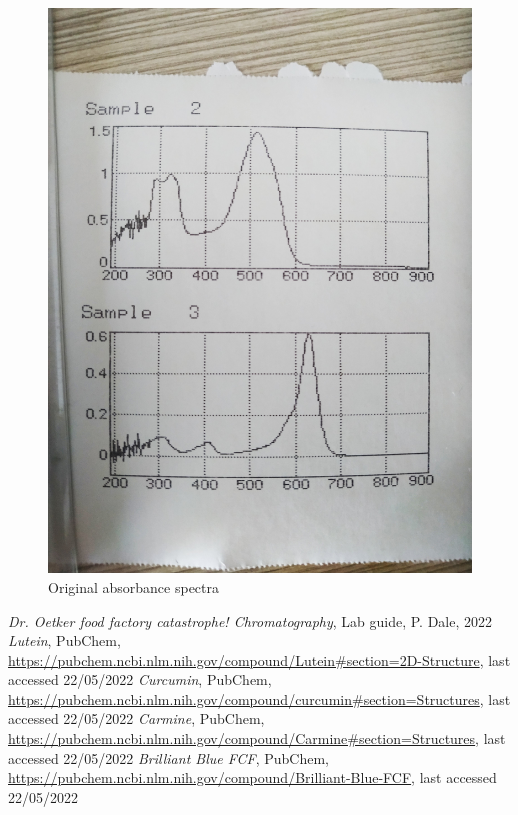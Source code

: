 \documentclass{article}
\begin{document}
\begin{figure}
    \centering
    \includegraphics[width=\textwidth,angle=-90]{absorbanceog.jpg}
    \caption{Original absorbance spectra}
    \label{fig:OG_absorbi}
\end{figure}
\FloatBarrier

\begin{thebibliography}{}
     \textit{Dr. Oetker food factory catastrophe! Chromatography}, Lab guide, P. Dale, 2022
     \textit{Lutein}, PubChem, \url{https://pubchem.ncbi.nlm.nih.gov/compound/Lutein#section=2D-Structure}, last accessed 22/05/2022
     \textit{Curcumin}, PubChem, \url{https://pubchem.ncbi.nlm.nih.gov/compound/curcumin#section=Structures}, last accessed 22/05/2022
     \textit{Carmine}, PubChem, \url{https://pubchem.ncbi.nlm.nih.gov/compound/Carmine#section=Structures}, last accessed 22/05/2022
     \textit{Brilliant Blue FCF}, PubChem, \url{https://pubchem.ncbi.nlm.nih.gov/compound/Brilliant-Blue-FCF}, last accessed 22/05/2022
\end{thebibliography}
\end{document}
